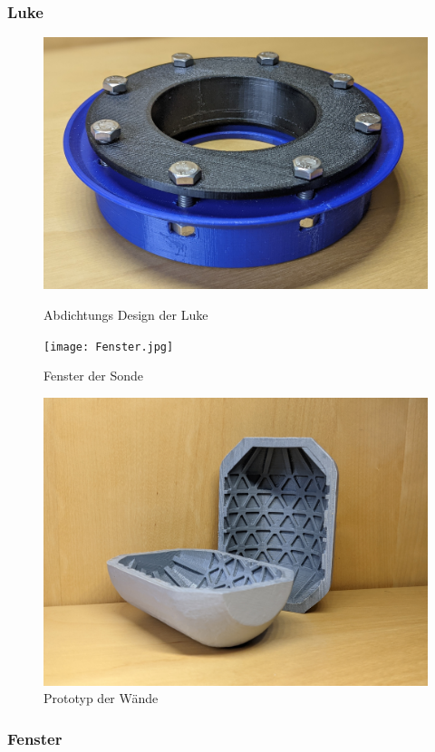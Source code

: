 \documentclass[11pt]{article}
\begin{document}
\subsubsection{Luke}
\begingroup
\begin{figure}
\centering
  {\setlength{\belowcaptionskip}{10pt}
    \includegraphics[width=\linewidth]{Lukev1.jpg}
    \caption{Abdichtungs Design der Luke}
    \texttt{[image: Fenster.jpg]}
    \caption{Fenster der Sonde}
    \includegraphics[width=\linewidth]{WandPrototyp.jpg}
    \caption{Prototyp der Wände}
  }
\end{figure}
\Luke

\subsubsection{Fenster}
\Fenster
\end{document}
